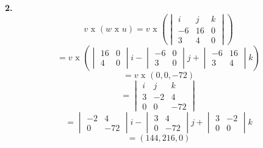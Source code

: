 \documentclass{article}
\begin{document}
    \textbf{2.}
    $$v \text{ x }(w \text{ x } u) = v \text{ x }\left(\begin{vmatrix}
        i & j & k \\
        -6 & 16 & 0 \\
        3 & 4 & 0 
    \end{vmatrix}\right)$$
    $$= v \text{ x } \left(\begin{vmatrix}
        16 & 0 \\
        4 & 0 
    \end{vmatrix}i - \begin{vmatrix}
        -6 & 0 \\
        3 & 0 
    \end{vmatrix}j + \begin{vmatrix}
        -6 & 16 \\
        3 & 4 
    \end{vmatrix}k\right)$$
    $$= v \text{ x } (0, 0, -72)$$
    $$ = \begin{vmatrix}
        i & j & k \\
        3 &  -2 & 4 \\  
        0 &  0 &  -72   
    \end{vmatrix}$$
    $$= \begin{vmatrix}
        -2 & 4 \\
        0 & -72
    \end{vmatrix}i- \begin{vmatrix}
        3 & 4 \\
        0 & -72 
    \end{vmatrix}j+\begin{vmatrix}
        3 & -2 \\
        0 & 0 
    \end{vmatrix}k$$
    $$=(144, 216, 0)$$
\end{document}
